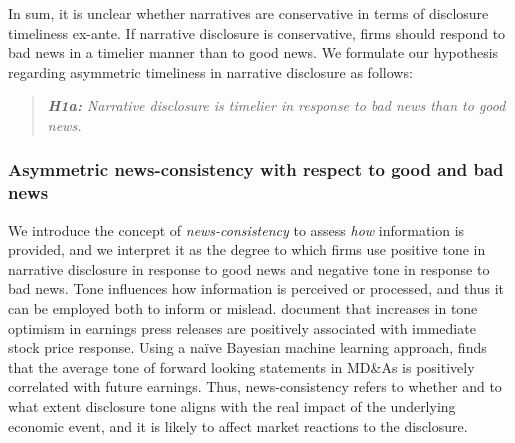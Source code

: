 \documentclass[letterpaper,12pt]{article}
\begin{document}
\begin{spacing}{1.5}
In sum, it is unclear whether narratives are conservative in terms of disclosure timeliness ex-ante. If narrative disclosure is conservative, firms should respond to bad news in a timelier manner than to good news. We formulate our hypothesis regarding asymmetric timeliness in narrative disclosure as follows:

\begin{quote}\label{hyp:h1a}
	\textit{\textbf{H1a:} Narrative disclosure is timelier in response to bad news than to good news.}
\end{quote}

\subsubsection{Asymmetric news-consistency with respect to good and bad news}

\noindent We introduce the concept of \textit{news-consistency} to assess \textit{how} information is provided, and we interpret it as the degree to which firms use positive tone in narrative disclosure in response to good news and negative tone in response to bad news. %
Tone influences how information is perceived or processed, and thus it can be employed both to inform or mislead.  document that increases in tone optimism in earnings press releases are positively associated with immediate stock price response. Using a naïve Bayesian machine learning approach,  finds that the average tone of forward looking statements in MD\&As is positively correlated with future earnings. Thus, news-consistency refers to whether and to what extent disclosure tone aligns with the real impact of the underlying economic event, and it is likely to affect market reactions to the disclosure. 


\end{spacing}
\end{document}
